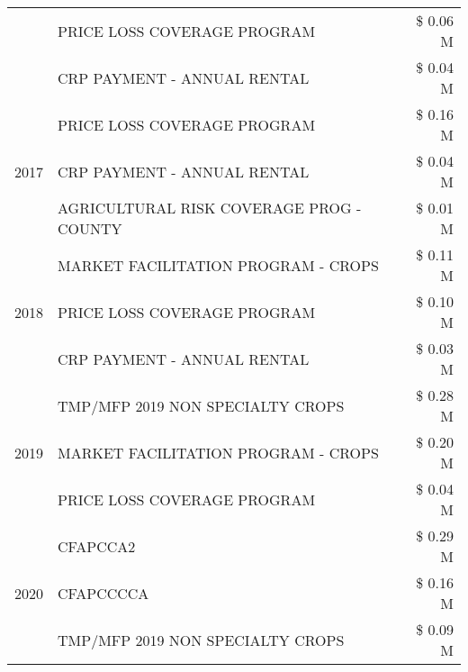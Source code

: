 \begin{tabular}{llr}
 & PRICE LOSS COVERAGE PROGRAM & \$ 0.06 M \\
 & CRP PAYMENT - ANNUAL RENTAL & \$ 0.04 M \\
\cline{1-3}
\multirow[t]{3}{*}{2017} & PRICE LOSS COVERAGE PROGRAM & \$ 0.16 M \\
 & CRP PAYMENT - ANNUAL RENTAL & \$ 0.04 M \\
 & AGRICULTURAL RISK COVERAGE PROG - COUNTY & \$ 0.01 M \\
\cline{1-3}
\multirow[t]{3}{*}{2018} & MARKET FACILITATION PROGRAM - CROPS & \$ 0.11 M \\
 & PRICE LOSS COVERAGE PROGRAM & \$ 0.10 M \\
 & CRP PAYMENT - ANNUAL RENTAL & \$ 0.03 M \\
\cline{1-3}
\multirow[t]{3}{*}{2019} & TMP/MFP 2019 NON SPECIALTY CROPS & \$ 0.28 M \\
 & MARKET FACILITATION PROGRAM - CROPS & \$ 0.20 M \\
 & PRICE LOSS COVERAGE PROGRAM & \$ 0.04 M \\
\cline{1-3}
\multirow[t]{3}{*}{2020} & CFAPCCA2 & \$ 0.29 M \\
 & CFAPCCCCA & \$ 0.16 M \\
 & TMP/MFP 2019 NON SPECIALTY CROPS & \$ 0.09 M \\
\cline{1-3}
\bottomrule
\end{tabular}
